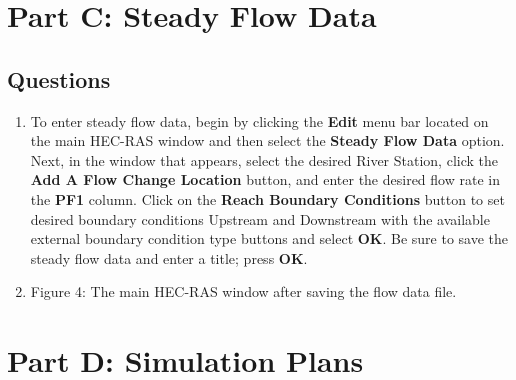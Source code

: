 \documentclass[]{article}
\newcommand\setItemnumber[1]{\setcounter{enumi}{\numexpr#1-1\relax}}
\begin{document}
\section{Part C: Steady Flow Data}
\noindent 
\subsection{Questions} \vspace{0.25cm} 
\begin{enumerate}[label=\textbf{\arabic*.}] 
	\setItemnumber{6}
	\item To enter steady flow data, begin by clicking the \textbf{Edit} menu bar located on the main HEC-RAS window and then select the \textbf{Steady Flow Data} option. Next, in the window that appears, select the desired River Station, click the \textbf{Add A Flow Change Location} button, and enter the desired flow rate in the \textbf{PF1} column. Click on the \textbf{Reach Boundary Conditions} button to set desired boundary conditions Upstream and Downstream with the available external boundary condition type buttons and select \textbf{OK}. Be sure to save the steady flow data and enter a title; press \textbf{OK}.
	\setItemnumber{7} \\
	\item \begin{minipage}[t]{\linewidth}
		\raggedright
		
		\medskip
		\begin{center} 
			Figure 4: The main HEC-RAS window after saving the flow data file.
		\end{center}
	\end{minipage}
\end{enumerate}
\newpage
\section{Part D: Simulation Plans}
\noindent 
\end{document}
